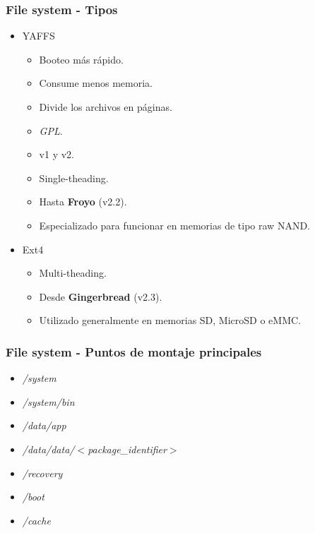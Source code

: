 \begin{frame}
  \frametitle{File system - Tipos}
  \begin{itemize}
      \item YAFFS
      \begin{itemize}
	\item Booteo más rápido.
	
	\item Consume menos memoria.
	
	\item Divide los archivos en páginas.
	
	\item \textit{GPL}.
	
	\item v1 y v2.
	
	\item Single-theading.
	
	\item Hasta \textbf{Froyo} (v2.2).
	
	\item Especializado para funcionar en memorias de tipo raw NAND.
      \end{itemize}
      
      \item Ext4
      \begin{itemize}
	\item Multi-theading.
	
	\item Desde \textbf{Gingerbread} (v2.3).
	
	\item Utilizado generalmente en memorias SD, MicroSD o eMMC.
      \end{itemize}   
  \end{itemize}
\end{frame}

\begin{frame}[fragile]
  \frametitle{File system - Puntos de montaje principales}
  \begin{itemize}
      \item \textit{/system}
      
      \item \textit{/system/bin}
      
      \item \textit{/data/app}
      
      \item \textit{/data/data/$<$package\_identifier$>$}
      
      \item \textit{/recovery}
      
      \item \textit{/boot}
      
      \item \textit{/cache}
  \end{itemize}
\end{frame}

